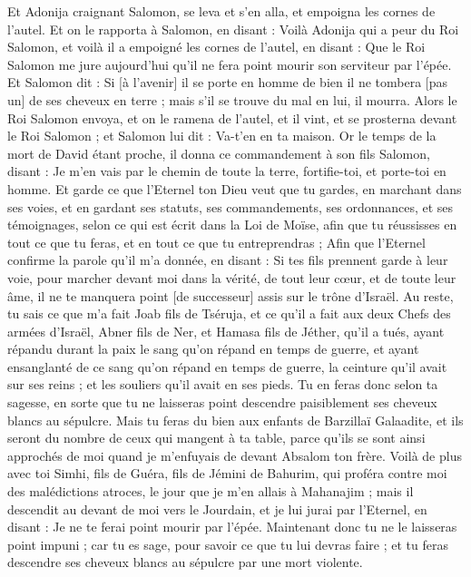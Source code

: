 \begin{multicols}{2}
Et Adonija craignant Salomon, se leva et s'en alla, et empoigna les cornes de l'autel.
Et on le rapporta à Salomon, en disant : Voilà Adonija qui a peur du Roi Salomon, et voilà il a empoigné les cornes de l'autel, en disant : Que le Roi Salomon me jure aujourd'hui qu'il ne fera point mourir son serviteur par l'épée.
Et Salomon dit : Si [à l'avenir] il se porte en homme de bien il ne tombera [pas un] de ses cheveux en terre ; mais s'il se trouve du mal en lui, il mourra.
Alors le Roi Salomon envoya, et on le ramena de l'autel, et il vint, et se prosterna devant le Roi Salomon ; et Salomon lui dit : Va-t'en en ta maison.
\VerseOne{}Or le temps de la mort de David étant proche, il donna ce commandement à son fils Salomon, disant :
Je m'en vais par le chemin de toute la terre, fortifie-toi, et porte-toi en homme.
Et garde ce que l'Eternel ton Dieu veut que tu gardes, en marchant dans ses voies, et en gardant ses statuts, ses commandements, ses ordonnances, et ses témoignages, selon ce qui est écrit dans la Loi de Moïse, afin que tu réussisses en tout ce que tu feras, et en tout ce que tu entreprendras ;
Afin que l'Eternel confirme la parole qu'il m'a donnée, en disant : Si tes fils prennent garde à leur voie, pour marcher devant moi dans la vérité, de tout leur cœur, et de toute leur âme, il ne te manquera point [de successeur] assis sur le trône d'Israël.
Au reste, tu sais ce que m'a fait Joab fils de Tséruja, et ce qu'il a fait aux deux Chefs des armées d'Israël, Abner fils de Ner, et Hamasa fils de Jéther, qu'il a tués, ayant répandu durant la paix le sang qu'on répand en temps de guerre, et ayant ensanglanté de ce sang qu'on répand en temps de guerre, la ceinture qu'il avait sur ses reins ; et les souliers qu'il avait en ses pieds.
Tu en feras donc selon ta sagesse, en sorte que tu ne laisseras point descendre paisiblement ses cheveux blancs au sépulcre.
Mais tu feras du bien aux enfants de Barzillaï Galaadite, et ils seront du nombre de ceux qui mangent à ta table, parce qu'ils se sont ainsi approchés de moi quand je m'enfuyais de devant Absalom ton frère.
Voilà de plus avec toi Simhi, fils de Guéra, fils de Jémini de Bahurim, qui proféra contre moi des malédictions atroces, le jour que je m'en allais à Mahanajim ; mais il descendit au devant de moi vers le Jourdain, et je lui jurai par l'Eternel, en disant : Je ne te ferai point mourir par l'épée.
Maintenant donc tu ne le laisseras point impuni ; car tu es sage, pour savoir ce que tu lui devras faire ; et tu feras descendre ses cheveux blancs au sépulcre par une mort violente.

\end{multicols}
